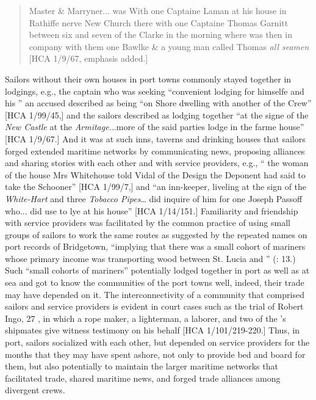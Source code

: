 \begin{quotation}
Master \& Marryner... was With one Captaine Laman at his house in Rathiffe nerve New Church there with one Captaine Thomas Garnitt between six and seven of the Clarke in the morning where was then in company with them one Bawlke \& a young man called Thomas \textit{all seamen} [HCA 1/9/67, emphasis added.] 
\end{quotation}

Sailors without their own houses in port towns commonly stayed together in lodgings, e.g., the captain who was seeking “convenient lodging for himselfe and his ” \citep[11,]{Gage1648} an accused  described as being “on Shore dwelling with another of the Crew” [HCA 1/99/45,] and the sailors described as lodging together “at the signe of the \textit{New Castle} at the \textit{Armitage.}..more of the said parties lodge in the farme house” [HCA 1/9/67.] And it was at such inns, taverns and drinking houses that sailors forged extended maritime networks by communicating news, proposing alliances and sharing stories with each other and with service providers, e.g., “ the woman of the house Mrs Whitehouse told Vidal of the Design the Deponent had said to take the Schooner” [HCA 1/99/7,] and “an inn-keeper, liveling at the sign of the \textit{White-Hart} and three \textit{Tobacco Pipes}… did inquire of him for one Joseph Passoff who... did use to lye at his house” [HCA 1/14/151.] Familiarity and friendship with service providers was facilitated by the common practice of using small groups of sailors to work the same routes as suggested by the repeated names on port records of Bridgetown, “implying that there was a small cohort of mariners whose primary income was transporting wood between St. Lucia and ” (\citealt{Draper2016}: 13.) Such “small cohorts of mariners” potentially lodged together in port as well as at sea and got to know the communities of the port towns well, indeed, their trade may have depended on it. The interconnectivity of a community that comprised sailors and service providers is evident in court cases such as the trial of Robert Ingo, 27 \citealt{May1636}, in which a rope maker, a lighterman, a laborer, and two of the ’s shipmates give witness testimony on his behalf [HCA 1/101/219-220.] Thus, in port, sailors socialized with each other, but depended on service providers for the months that they may have spent ashore, not only to provide bed and board for them, but also potentially to maintain the larger maritime networks that facilitated trade, shared maritime news, and forged trade alliances among divergent crews. 

